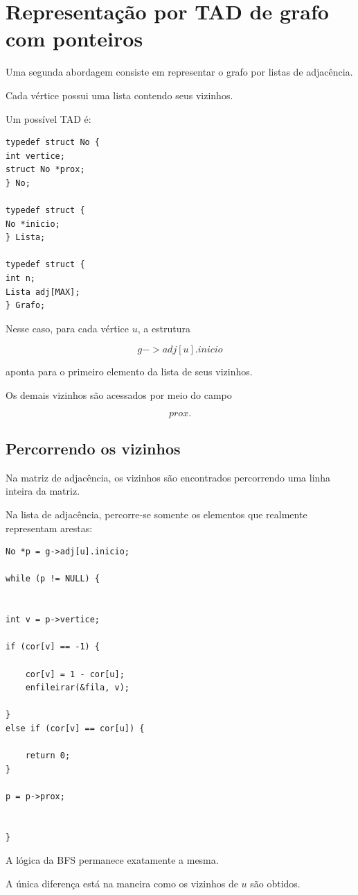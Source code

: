 \documentclass[12pt,a4paper]{article}
\begin{document}
\section{Representação por TAD de grafo com ponteiros}

Uma segunda abordagem consiste em representar o grafo por listas de
adjacência.

Cada vértice possui uma lista contendo seus vizinhos.

Um possível TAD é:

\begin{verbatim}
typedef struct No {
int vertice;
struct No *prox;
} No;

typedef struct {
No *inicio;
} Lista;

typedef struct {
int n;
Lista adj[MAX];
} Grafo;
\end{verbatim}

Nesse caso, para cada vértice $u$, a estrutura

$$
g->adj[u].inicio
$$

aponta para o primeiro elemento da lista de seus vizinhos.

Os demais vizinhos são acessados por meio do campo

$$
prox.
$$

\subsection{Percorrendo os vizinhos}

Na matriz de adjacência, os vizinhos são encontrados percorrendo uma
linha inteira da matriz.

Na lista de adjacência, percorre-se somente os elementos que realmente
representam arestas:

\begin{verbatim}
No *p = g->adj[u].inicio;

while (p != NULL) {


int v = p->vertice;

if (cor[v] == -1) {

    cor[v] = 1 - cor[u];
    enfileirar(&fila, v);

}
else if (cor[v] == cor[u]) {

    return 0;
}

p = p->prox;


}
\end{verbatim}

A lógica da BFS permanece exatamente a mesma.

A única diferença está na maneira como os vizinhos de $u$ são
obtidos.
\end{document}

